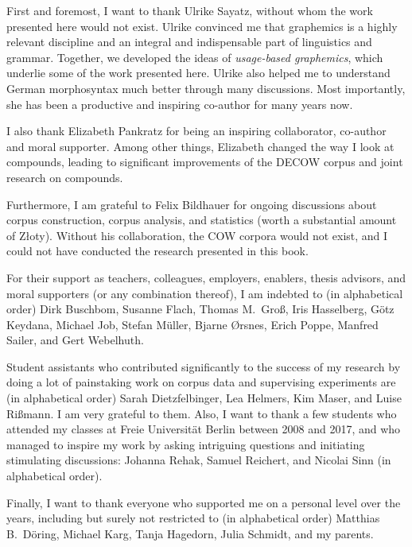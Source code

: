 
First and foremost, I want to thank Ulrike Sayatz, without whom the work presented here would not exist.
Ulrike convinced me that graphemics is a highly relevant discipline and an integral and indispensable part of linguistics and grammar.
Together, we developed the ideas of \textit{usage-based graphemics}, which underlie some of the work presented here.
Ulrike also helped me to understand German morphosyntax much better through many discussions.
Most importantly, she has been a productive and inspiring co-author for many years now.

I also thank Elizabeth Pankratz for being an inspiring collaborator, co-author and moral supporter.
Among other things, Elizabeth changed the way I look at compounds, leading to significant improvements of the DECOW corpus and joint research on compounds.

Furthermore, I am grateful to Felix Bildhauer for ongoing discussions about corpus construction, corpus analysis, and statistics (worth a substantial amount of Złoty).
Without his collaboration, the COW corpora would not exist, and I could not have conducted the research presented in this book.

For their support as teachers, colleagues, employers, enablers, thesis advisors, and moral supporters (or any combination thereof), I am indebted to (in alphabetical order) Dirk Buschbom, Susanne Flach, Thomas M.\ Groß, Iris Hasselberg, Götz Keydana, Michael Job, Stefan Müller, Bjarne Ørsnes, Erich Poppe, Manfred Sailer, and Gert Webelhuth.

Student assistants who contributed significantly to the success of my research by doing a lot of painstaking work on corpus data and supervising experiments are (in alphabetical order) Sarah Dietzfelbinger, Lea Helmers, Kim Maser, and Luise Rißmann.
I am very grateful to them.
Also, I want to thank a few students who attended my classes at Freie Universität Berlin between 2008 and 2017, and who managed to inspire my work by asking intriguing questions and initiating stimulating discussions: Johanna Rehak, Samuel Reichert, and Nicolai Sinn (in alphabetical order).

Finally, I want to thank everyone who supported me on a personal level over the years, including but surely not restricted to (in alphabetical order) Matthias B.\ Döring, Michael Karg, Tanja Hagedorn, Julia Schmidt, and my parents.

